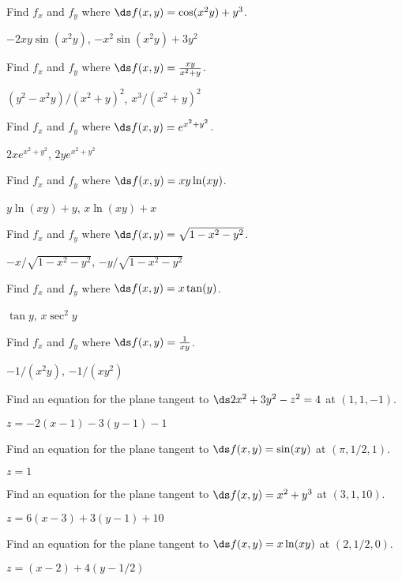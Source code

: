 \begin{exercises}

\exercise Find $f_x$ and $f_y$ where $\ds f(x,y)=\cos(x^2y)+y^3$.
\begin{answer} $-2xy\sin(x^2y)$, $-x^2\sin(x^2y)+3y^2$
\end{answer}

\exercise Find $f_x$ and $f_y$ where $\ds f(x,y)={xy\over x^2+y}$.
\begin{answer} $(y^2-x^2y)/(x^2+y)^2$, $x^3/(x^2+y)^2$
\end{answer}

\exercise Find $f_x$ and $f_y$ where $\ds f(x,y)=e^{x^2+y^2}$.
\begin{answer} $2xe^{x^2+y^2}$, $2ye^{x^2+y^2}$
\end{answer}

\exercise Find $f_x$ and $f_y$ where $\ds f(x,y)=xy\ln(xy)$.
\begin{answer} $y\ln(xy)+y$, $x\ln(xy)+x$
\end{answer}

\exercise Find $f_x$ and $f_y$ where $\ds f(x,y)=\sqrt{1-x^2-y^2}$.
\begin{answer} $-x/\sqrt{1-x^2-y^2}$, $-y/\sqrt{1-x^2-y^2}$
\end{answer}

\exercise Find $f_x$ and $f_y$ where $\ds f(x,y)=x\tan(y)$.
\begin{answer} $\tan y$, $x\sec^2 y$
\end{answer}

\exercise Find $f_x$ and $f_y$ where $\ds f(x,y)={1\over xy}$.
\begin{answer} $-1/(x^2y)$, $-1/(xy^2)$
\end{answer}

\exercise Find an equation for the plane tangent to 
$\ds 2x^2+3y^2-z^2=4$ at
$(1,1,-1)$. 
\begin{answer} $z=-2(x-1)-3(y-1)-1$
\end{answer}

\exercise Find an equation for the plane tangent to 
$\ds f(x,y)=\sin(xy)$ at
$(\pi,1/2,1)$. 
\begin{answer} $z=1$
\end{answer}

\exercise Find an equation for the plane tangent to 
$\ds f(x,y)=x^2+y^3$ at
$(3,1,10)$. 
\begin{answer} $z=6(x-3)+3(y-1)+10$
\end{answer}

\exercise Find an equation for the plane tangent to 
$\ds f(x,y)=x\ln(xy)$ at
$(2,1/2,0)$. 
\label{ex:ln tan plane}
\begin{answer} $z=(x-2)+4(y-1/2)$
\end{answer}


\end{exercises}
